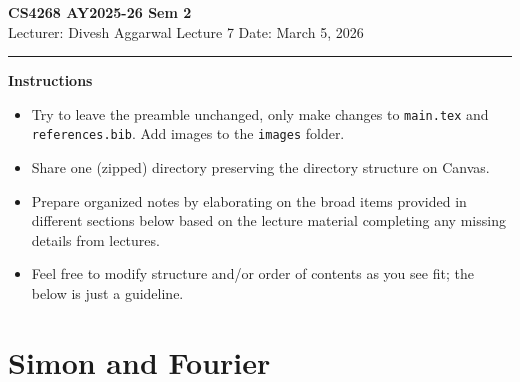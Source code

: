 



% 


\newpage
\noindent
\textbf{CS4268 AY2025-26 Sem 2}
\\
\noindent
Lecturer: Divesh Aggarwal
\hfill
Lecture 7                      %
\hfill
Date: March 5, 2026          %


\noindent
\rule{\textwidth}{1pt}

\medskip


\textbf{Instructions}\\
\begin{itemize}
    \item Try to leave the preamble unchanged, only make changes to \texttt{main.tex} and  \texttt{references.bib}. Add images to the \texttt{images} folder. 
    \item Share one (zipped) directory preserving the directory structure on Canvas. 
    \item Prepare organized notes by elaborating on the broad items provided in different sections below based on the lecture material completing any missing details from lectures.
    \item Feel free to modify structure and/or order of contents as you see fit; the below is just a guideline.
\end{itemize} 

\section{Simon and Fourier}



















% 
% 
% 
